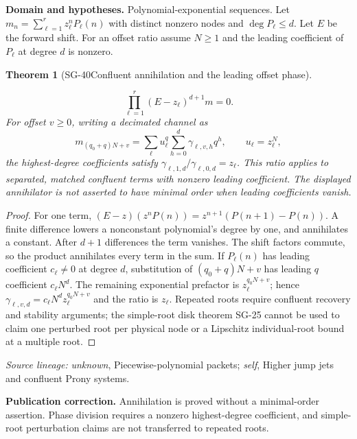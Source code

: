 \documentclass[11pt]{article}
\newtheorem{theorem}{Theorem}[section]
\theoremstyle{definition}\newtheorem{definition}[theorem]{Definition}
\theoremstyle{remark}\newtheorem{remark}[theorem]{Remark}
\begin{document}
\par{\small\textbf{Domain and hypotheses.} Polynomial-exponential sequences. Let $m_n=\sum_{\ell=1}^rz_\ell^nP_\ell(n)$ with distinct nonzero nodes and $\deg P_\ell\le d$. Let $E$ be the forward shift. For an offset ratio assume $N\ge1$ and the leading coefficient of $P_\ell$ at degree $d$ is nonzero.}\par
\begin{theorem}[SG-40\quad Confluent annihilation and the leading offset phase]\label{SG-40}

\[
 \prod_{\ell=1}^r(E-z_\ell)^{d+1}m=0.
\]
For offset $v\ge0$, writing a decimated channel as
\[
 m_{(q_0+q)N+v}=\sum_\ell u_\ell^q
                   \sum_{h=0}^d\gamma_{\ell,v,h}q^h,
 \qquad u_\ell=z_\ell^N,
\]
the highest-degree coefficients satisfy
$\gamma_{\ell,1,d}/\gamma_{\ell,0,d}=z_\ell$.
This ratio applies to separated, matched confluent terms with nonzero leading
coefficient. The displayed annihilator is not asserted to have minimal order
when leading coefficients vanish.

\end{theorem}
\begin{proof}

For one term, $(E-z)(z^nP(n))=z^{n+1}(P(n+1)-P(n))$.
A finite difference lowers a nonconstant polynomial's degree by one, and
annihilates a constant. After $d+1$ differences the term vanishes. The shift
factors commute, so the product annihilates every term in the sum.
If $P_\ell(n)$ has leading coefficient $c_\ell\ne0$ at degree $d$, substitution
of $(q_0+q)N+v$ has leading $q$ coefficient $c_\ell N^d$.
The remaining exponential prefactor is $z_\ell^{q_0N+v}$; hence
$\gamma_{\ell,v,d}=c_\ell N^dz_\ell^{q_0N+v}$ and the ratio is $z_\ell$.
Repeated roots require confluent recovery and stability arguments; the
simple-root disk theorem SG-25 cannot be used to claim one perturbed root
per physical node or a Lipschitz individual-root bound at a multiple root.

\end{proof}

\par{\small\color{Teal}\textit{Source lineage:} \textit{unknown}, Piecewise-polynomial packets; \textit{self}, Higher jump jets and confluent Prony systems.}\par

\par{\small\textbf{Publication correction.} Annihilation is proved without a minimal-order assertion. Phase division requires a nonzero highest-degree coefficient, and simple-root perturbation claims are not transferred to repeated roots.}\par
\end{document}
